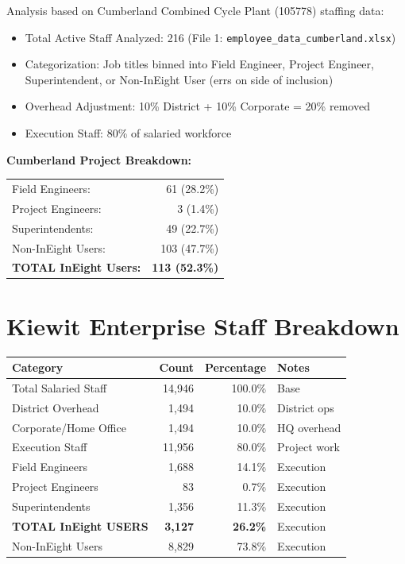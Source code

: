 \documentclass[11pt, letterpaper]{article}
\begin{document}
Analysis based on Cumberland Combined Cycle Plant (105778) staffing data:
\begin{itemize}[nosep, leftmargin=2em]
    \item Total Active Staff Analyzed: 216 (File 1: \texttt{employee\_data\_cumberland.xlsx})
    \item Categorization: Job titles binned into Field Engineer, Project Engineer, Superintendent, or Non-InEight User (errs on side of inclusion)
    \item Overhead Adjustment: 10\% District + 10\% Corporate = 20\% removed
    \item Execution Staff: 80\% of salaried workforce
\end{itemize}

\textbf{Cumberland Project Breakdown:}
\begin{center}
\begin{tabular}{lr}
Field Engineers: & 61 (28.2\%) \\
Project Engineers: & 3 (1.4\%) \\
Superintendents: & 49 (22.7\%) \\
Non-InEight Users: & 103 (47.7\%) \\
\midrule
\textbf{TOTAL InEight Users:} & \textbf{113 (52.3\%)} \\
\end{tabular}
\end{center}

\vspace{1em}

\section*{Kiewit Enterprise Staff Breakdown}

\begin{center}
\footnotesize
\begin{tabularx}{\textwidth}{@{}X r r X@{}}
\toprule
\textbf{Category} & \textbf{Count} & \textbf{Percentage} & \textbf{Notes} \\
\midrule
Total Salaried Staff & 14,946 & 100.0\% & Base \\
District Overhead & 1,494 & 10.0\% & District ops \\
Corporate/Home Office & 1,494 & 10.0\% & HQ overhead \\
Execution Staff & 11,956 & 80.0\% & Project work \\
\midrule
Field Engineers & 1,688 & 14.1\% & Execution \\
Project Engineers & 83 & 0.7\% & Execution \\
Superintendents & 1,356 & 11.3\% & Execution \\
\midrule
\textbf{TOTAL InEight USERS} & \textbf{3,127} & \textbf{26.2\%} & Execution \\
Non-InEight Users & 8,829 & 73.8\% & Execution \\
\bottomrule
\end{tabularx}
\end{center}
\end{document}
